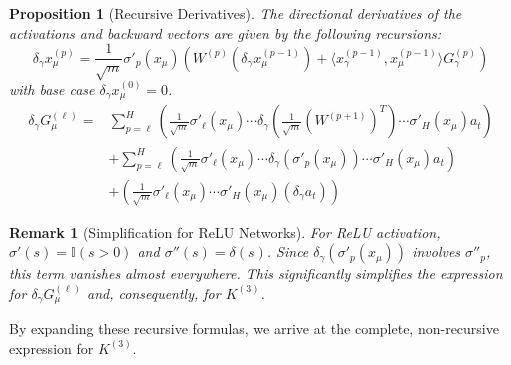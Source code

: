 \documentclass{article}
\newtheorem{proposition}[theorem]{Proposition}
\newtheorem{remark}[theorem]{Remark}
\begin{document}
\begin{proposition}[Recursive Derivatives]
The directional derivatives of the activations and backward vectors are given by the following recursions:
\begin{equation}
\delta_\gamma x^{(p)}_\mu = \frac{1}{\sqrt{m}} \sigma'_{p}(x_\mu) \left( W^{(p)} (\delta_\gamma x^{(p-1)}_\mu) + \langle x^{(p-1)}_\gamma, x^{(p-1)}_\mu \rangle G^{(p)}_\gamma \right)
\end{equation}
with base case $\delta_\gamma x^{(0)}_\mu = 0$.
\begin{align}
\delta_\gamma G^{(\ell)}_\mu = & \sum_{p=\ell}^{H} \left( \frac{1}{\sqrt{m}}\sigma'_\ell(x_\mu) \cdots \delta_\gamma(\frac{1}{\sqrt{m}}(W^{(p+1)})^T) \cdots \sigma'_H(x_\mu) a_t \right) \nonumber \\
& + \sum_{p=\ell}^{H} \left( \frac{1}{\sqrt{m}}\sigma'_\ell(x_\mu) \cdots \delta_\gamma(\sigma'_{p}(x_\mu)) \cdots \sigma'_H(x_\mu) a_t \right) \nonumber \\
& + \left( \frac{1}{\sqrt{m}}\sigma'_\ell(x_\mu) \cdots \sigma'_H(x_\mu) (\delta_\gamma a_t) \right)
\end{align}
\end{proposition}

\begin{remark}[Simplification for ReLU Networks]
For ReLU activation, $\sigma'(s) = \mathbb{I}(s>0)$ and $\sigma''(s) = \delta(s)$. Since $\delta_\gamma(\sigma'_{p}(x_\mu))$ involves $\sigma''_{p}$, this term vanishes almost everywhere. This significantly simplifies the expression for $\delta_\gamma G^{(\ell)}_\mu$ and, consequently, for $K^{(3)}$.
\end{remark}

By expanding these recursive formulas, we arrive at the complete, non-recursive expression for $K^{(3)}$.
\end{document}

